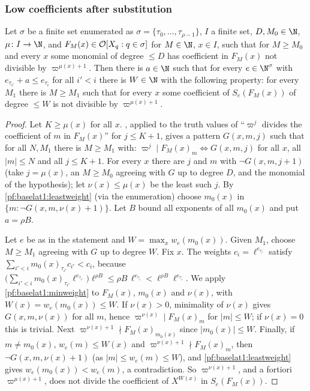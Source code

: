 \subsubsection{Low coefficients after substitution}

\begin{proposition}\label{pf:baselat1:lowlimit}
Let $\sigma$ be a finite set enumerated as $\sigma=\{\tau_0,\dots,\tau_{\rho-1}\}$, $I$ a finite set, $D,M_0\in\N$,
$\mu\colon I\to\N$, and $F_M(x)\in\mathcal O[X_q:q\in\sigma]$ for $M\in\N$, $x\in I$, such that for $M\ge M_0$ and every
$x$ some monomial of degree $\le D$ has coefficient in $F_M(x)$ not divisible by $\varpi^{\mu(x)+1}$. Then there is $a\in\N$
such that for every $e\in\N^\sigma$ with $e_{\tau_{i'}}+a\le e_{\tau_i}$ for all $i'<i$ there is $W\in\N$ with the
following property: for every $M_1$ there is $M\ge M_1$ such that for every $x$ some coefficient of $S_e(F_M(x))$ of degree
$\le W$ is not divisible by $\varpi^{\mu(x)+1}$.
\end{proposition}

\begin{proof}
Let $K\ge\mu(x)$ for all $x$. , applied to the truth values of ``$\varpi^j$ divides the coefficient
of $m$ in $F_M(x)$'' for $j\le K+1$, gives a pattern $G(x,m,j)$ such that for all $N,M_1$ there is $M\ge M_1$ with:
$\varpi^j\mid F_M(x)_m\Leftrightarrow G(x,m,j)$ for all $x$, all $|m|\le N$ and all $j\le K+1$. For every $x$ there are $j$
and $m$ with $\neg G(x,m,j+1)$ (take $j=\mu(x)$, an $M\ge M_0$ agreeing with $G$ up to degree $D$, and the monomial of the
hypothesis); let $\nu(x)\le\mu(x)$ be the least such $j$. By \cref{pf:baselat1:leastweight} (via the enumeration) choose
$m_0(x)$ in $\{m:\neg G(x,m,\nu(x)+1)\}$. Let $B$ bound all exponents of all $m_0(x)$ and put $a=\rho B$.

Let $e$ be as in the statement and $W=\max_xw_e(m_0(x))$. Given $M_1$, choose $M\ge M_1$ agreeing with $G$ up to degree
$W$. Fix $x$. The weights $c_i=\ell^{e_{\tau_i}}$ satisfy $\sum_{i'<i}m_0(x)_{\tau_{i'}}c_{i'}<c_i$, because
$\bigl(\sum_{i'<i}m_0(x)_{\tau_{i'}}\ell^{e_{\tau_{i'}}}\bigr)\ell^{\rho B}\le\rho B\,\ell^{e_{\tau_i}}<\ell^{\rho B}\ell^{e_{\tau_i}}$.
We apply \cref{pf:baselat1:minweight} to $F_M(x)$, $m_0(x)$ and $\nu(x)$, with $W(x)=w_e(m_0(x))\le W$. If $\nu(x)>0$,
minimality of $\nu(x)$ gives $G(x,m,\nu(x))$ for all $m$, hence $\varpi^{\nu(x)}\mid F_M(x)_m$ for $|m|\le W$; if
$\nu(x)=0$ this is trivial. Next $\varpi^{\nu(x)+1}\nmid F_M(x)_{m_0(x)}$ since $|m_0(x)|\le W$. Finally, if $m\ne m_0(x)$,
$w_e(m)\le W(x)$ and $\varpi^{\nu(x)+1}\nmid F_M(x)_m$, then $\neg G(x,m,\nu(x)+1)$ (as $|m|\le w_e(m)\le W$), and
\cref{pf:baselat1:leastweight} gives $w_e(m_0(x))<w_e(m)$, a contradiction. So $\varpi^{\nu(x)+1}$, and a fortiori
$\varpi^{\mu(x)+1}$, does not divide the coefficient of $X^{W(x)}$ in $S_e(F_M(x))$.
\end{proof}

